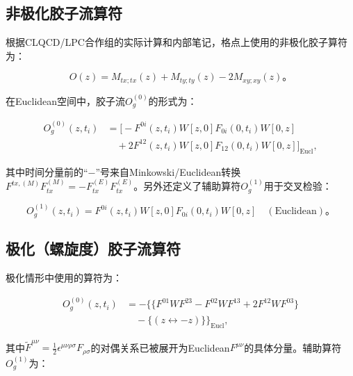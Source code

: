\documentclass[12pt,a4paper]{ctexart}
\theoremstyle{definition}
\begin{document}
\subsection{非极化胶子流算符}

根据CLQCD/LPC合作组的实际计算\cite{Chen2025gluon}和内部笔记\cite{NoteGluonPDFs}，格点上使用的非极化胶子算符为：

\begin{equation}
O(z) = M_{tx;tx}(z) + M_{ty;ty}(z) - 2M_{xy;xy}(z)。
\label{eq:unpol_lattice_op}
\end{equation}

在Euclidean空间中，胶子流$O^{(0)}_g$的形式为\cite{NoteGluonPDFs}：

\begin{equation}
\begin{aligned}
O^{(0)}_g(z, t_i) &= \Big[ -F^{0i}(z,t_i)W[z,0]F_{0i}(0,t_i)W[0,z] \\
&\quad + 2F^{12}(z,t_i)W[z,0]F_{12}(0,t_i)W[0,z] \Big]_{\text{Eucl}},
\end{aligned}
\label{eq:Og0_eucl}
\end{equation}

其中时间分量前的``$-$''号来自Minkowski/Euclidean转换$F^{tx,(M)}F^{(M)}_{tx} = -F^{(E)}_{tx}F^{(E)}_{tx}$。另外还定义了辅助算符$O^{(1)}_g$用于交叉检验：

\begin{equation}
O^{(1)}_g(z, t_i) = F^{0i}(z,t_i)W[z,0]F_{0i}(0,t_i)W[0,z] \quad (\text{Euclidean})。
\label{eq:Og1_eucl}
\end{equation}

\subsection{极化（螺旋度）胶子流算符}

极化情形中使用的算符为\cite{NoteGluonPDFs}：

\begin{equation}
\begin{aligned}
O^{(0)}_g(z, t_i) &= -\Big\{ \{F^{01}W F^{23} - F^{02}W F^{13} + 2F^{12}W F^{03}\} \\
&\quad - \{ (z \leftrightarrow -z) \} \Big\}_{\text{Eucl}},
\end{aligned}
\label{eq:pol_gluon_current}
\end{equation}

其中$\tilde{F}^{\mu\nu} = \frac{1}{2}\epsilon^{\mu\nu\rho\sigma}F_{\rho\sigma}$的对偶关系已被展开为Euclidean$F^{\mu\nu}$的具体分量。辅助算符$O^{(1)}_g$为：
\end{document}
